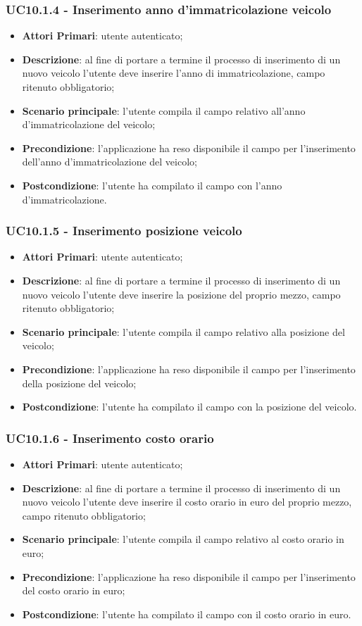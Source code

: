 \subsubsection{UC10.1.4 - Inserimento anno d'immatricolazione veicolo}
\begin{itemize}
	\item \textbf{Attori Primari}: utente autenticato;
	\item \textbf{Descrizione}: al fine di portare a termine il processo di inserimento di un nuovo veicolo l'utente deve inserire l'anno di immatricolazione, campo ritenuto obbligatorio;
	\item \textbf{Scenario principale}: l'utente compila il campo relativo all'anno d'immatricolazione del veicolo;	
	\item \textbf{Precondizione}: l'applicazione ha reso disponibile il campo per l'inserimento dell'anno d'immatricolazione del veicolo;
	\item \textbf{Postcondizione}: l'utente ha compilato il campo con l'anno d'immatricolazione.	
\end{itemize}
\subsubsection{UC10.1.5 - Inserimento posizione veicolo}
\begin{itemize}
	\item \textbf{Attori Primari}: utente autenticato;
	\item \textbf{Descrizione}: al fine di portare a termine il processo di inserimento di un nuovo veicolo l'utente deve inserire la posizione del proprio mezzo, campo ritenuto obbligatorio;
	\item \textbf{Scenario principale}: l'utente compila il campo relativo alla posizione del veicolo;	
	\item \textbf{Precondizione}: l'applicazione ha reso disponibile il campo per l'inserimento della posizione del veicolo;
	\item \textbf{Postcondizione}: l'utente ha compilato il campo con la posizione del veicolo.	
\end{itemize}
\subsubsection{UC10.1.6 - Inserimento costo orario}
\begin{itemize}
	\item \textbf{Attori Primari}: utente autenticato;
	\item \textbf{Descrizione}: al fine di portare a termine il processo di inserimento di un nuovo veicolo l'utente deve inserire il costo orario in euro del proprio mezzo, campo ritenuto obbligatorio;
	\item \textbf{Scenario principale}: l'utente compila il campo relativo al costo orario in euro;	
	\item \textbf{Precondizione}: l'applicazione ha reso disponibile il campo per l'inserimento del costo orario in euro;
	\item \textbf{Postcondizione}: l'utente ha compilato il campo con il costo orario in euro.	
\end{itemize}

